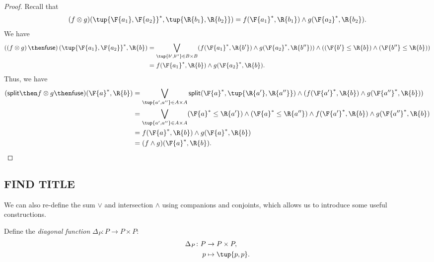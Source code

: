 \begin{proof}
    Recall that 
    \begin{equation}
        (f\otimes g)(\tup{\F{a_1},\F{a_2}}^*,\tup{\R{b_1},\R{b_2}})=f(\F{a_1}^*,\R{b_1})\wedge g(\F{a_2}^*,\R{b_2}).
    \end{equation}
    We have
    \begin{equation}
        \begin{aligned}
            \left(\left(f\otimes g\right) \then \mathsf{fuse}\right)(\tup{\F{a_1},\F{a_2}}^*,\R{b})&=\bigvee_{\tup{b',b''}\in B\times B}(f(\F{a_1}^*,\R{b'})\wedge g(\F{a_2}^*,\R{b''}))\wedge ((\F{b'}\leq \R{b}) \wedge (\F{b''}\leq \R{b}))\\
            &=f(\F{a_1}^*,\R{b})\wedge g(\F{a_2}^*,\R{b}).
        \end{aligned}
    \end{equation}
    Thus, we have
    \begin{equation}
        \begin{aligned}
        (\mathsf{split}\then f\otimes g\then \mathsf{fuse})(\F{a}^*,\R{b})&=\bigvee_{\tup{a',a''}\in A\times A} \mathsf{split}(\F{a}^*,\tup{\R{a'},\R{a''}})\wedge (f(\F{a'}^*,\R{b})\wedge g(\F{a''}^*,\R{b}))\\
        &=\bigvee_{\tup{a',a''}\in A\times A}(\F{a}^*\leq \R{a'})\wedge (\F{a}^*\leq \R{a''})\wedge f(\F{a'}^*,\R{b})\wedge g(\F{a''}^*,\R{b})\\
        &=f(\F{a}^*,\R{b})\wedge g(\F{a}^*,\R{b})\\
        &=(f\wedge g)(\F{a}^*,\R{b}).
        \end{aligned}
    \end{equation}
\end{proof}

\subsection{FIND TITLE}

We can also re-define the sum $\vee$ and intersection $\wedge$ using companions and conjoints, which allows us to introduce some useful constructions.

\begin{definition}
Define the \emph{diagonal function} $\Delta_P\colon P \to P \times P$:
\begin{equation}
\begin{aligned}
    \Delta_P \colon P & \to P \times P, \\
             p & \mapsto \tup{p, p}.
\end{aligned}
\end{equation}
\end{definition}

